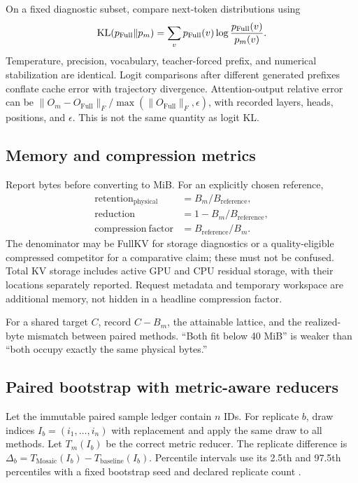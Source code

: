 On a fixed diagnostic subset, compare next-token distributions using
\begin{equation}
 \operatorname{KL}(p_{\mathrm{Full}}\Vert p_m)
 =\sum_v p_{\mathrm{Full}}(v)
 \log\frac{p_{\mathrm{Full}}(v)}{p_m(v)}.
\end{equation}
Temperature, precision, vocabulary, teacher-forced prefix, and numerical
stabilization are identical. Logit comparisons after different generated
prefixes conflate cache error with trajectory divergence. Attention-output
relative error can be
$\lVert O_m-O_{\mathrm{Full}}\rVert_F/
\max(\lVert O_{\mathrm{Full}}\rVert_F,\epsilon)$, with recorded layers, heads,
positions, and $\epsilon$. This is not the same quantity as logit KL.

\subsection{Memory and compression metrics}
Report bytes before converting to MiB. For an explicitly chosen reference,
\begin{align}
 \mathrm{retention}_{\mathrm{physical}}&=B_m/B_{\mathrm{reference}},\\
 \mathrm{reduction}&=1-B_m/B_{\mathrm{reference}},\\
 \mathrm{compression\ factor}&=B_{\mathrm{reference}}/B_m.
\end{align}
The denominator may be FullKV for storage diagnostics or a quality-eligible
compressed competitor for a comparative claim; these must not be confused.
Total KV storage includes active GPU and CPU residual storage, with their
locations separately reported. Request metadata and temporary workspace are
additional memory, not hidden in a headline compression factor.

For a shared target $C$, record $C-B_m$, the attainable lattice, and the
realized-byte mismatch between paired methods. ``Both fit below 40 MiB'' is
weaker than ``both occupy exactly the same physical bytes.''

\subsection{Paired bootstrap with metric-aware reducers}
Let the immutable paired sample ledger contain $n$ IDs. For replicate $b$, draw
indices $I_b=(i_1,\ldots,i_n)$ with replacement and apply the same draw to all
methods. Let $T_m(I_b)$ be the correct metric reducer. The replicate difference
is $\Delta_b=T_{\mathrm{Mosaic}}(I_b)-T_{\mathrm{baseline}}(I_b)$.
Percentile intervals use its 2.5th and 97.5th percentiles with a fixed bootstrap
seed and declared replicate count \citep{efron1979bootstrap}.


